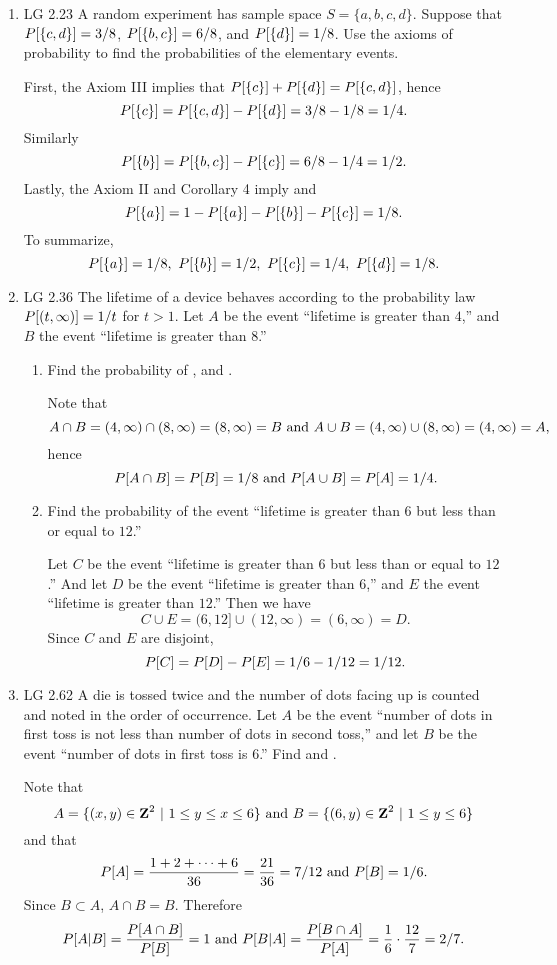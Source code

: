\begin{enumerate}
	\item LG 2.23
	\ifdefined\sol
	A random experiment has sample space $S = \{a, b, c, d\}$.
	Suppose that $P[\{c, d\}] = 3/8$,
	$P[\{b, c\}] = 6/8$,
	and $P[\{d\}] = 1/8$.
	Use the axioms of probability
	to find the probabilities of the elementary events.
	\begin{solution}
	First, the Axiom III implies that $P[\{c\}] + P[\{d\}] = P[\{c,d\}]$,
	hence \[
		P[\{c\}] = P[\{c,d\}] - P[\{d\}] = 3/8 - 1/8 = 1/4.
	\]
	Similarly \[P[\{b\}] = P[\{b,c\}] - P[\{c\}] = 6/8 - 1/4 = 1/2.\]
	Lastly, the Axiom II and Corollary 4 imply
	and \[P[\{a\}] = 1 - P[\{a\}] - P[\{b\}] - P[\{c\}] = 1/8.\]
	To summarize,
	\[
		P[\{a\}] = 1/8,\
		P[\{b\}] = 1/2,\
		P[\{c\}] = 1/4,\
		P[\{d\}] = 1/8.
	\]
	\end{solution}
	\fi

	\item LG 2.36
	\ifdefined\sol
	The lifetime of a device behaves according to the probability law
	$P[(t, \infty)] = 1/t$ for $t > 1$.
	Let $A$ be the event ``lifetime is greater than $4$,''
	and $B$ the event ``lifetime is greater than $8$.''
	\begin{enumerate}
		\item Find the probability of \acapb, and \acupb.
		\begin{solution}
		Note that
		\[
			A\cap B = (4,\infty) \cap (8,\infty) = (8,\infty) = B
			\mbox{ and }
			A\cup B = (4,\infty) \cup (8,\infty) = (4,\infty) = A,
		\]
		hence
		\[
			P[A\cap B] = P[B] = 1/8
			\mbox{ and }
			P[A\cup B] = P[A] = 1/4.
		\]
		\end{solution}

		\item Find the probability of
		the event ``lifetime is greater than $6$ but less than or equal to $12$.''
		\begin{solution}
			Let $C$ be the event ``lifetime is greater than $6$ but less than or equal to $12$.''
			And let $D$ be the event ``lifetime is greater than $6$,''
			and $E$ the event ``lifetime is greater than $12$.''
			Then we have
			\[
				C \cup E = (6,12] \cup (12,\infty) = (6,\infty) = D.
			\]
			Since $C$ and $E$ are disjoint,
			\[
				P[C] = P[D] - P[E] = 1/6 - 1/12 = 1/12.
			\]
		\end{solution}
	\end{enumerate}
	\fi


	\item LG 2.62
	\ifdefined\sol
	A die is tossed twice and the number of dots facing up is
	counted and noted in the order of occurrence.
	Let $A$ be the event
	``number of dots in first toss is not less than number of dots
	in second toss,''
	and let $B$ be the event
	``number of dots in first toss is $6$.''
	Find \cpr{A}{B} and .
	\begin{solution}
		Note that
		\[
			A = \{(x,y)\in{\mbox{\bf Z}}^2~|~1\leq y\leq x\leq 6\}
			\mbox{ and }
			B = \{(6,y)\in{\mbox{\bf Z}}^2~|~1\leq y\leq 6\}
		\]
		and that
		\[
			P[A] = \frac{1+2+\cdots+6}{36} = \frac{21}{36} = 7/12
			\mbox{ and }
			P[B] = 1/6.
		\]
		Since $B\subset A$, $A\cap B = B$.
		Therefore
		\[
			P[A|B] = \frac{P[A\cap B]}{P[B]} = 1
			\mbox{ and }
			P[B|A] = \frac{P[B\cap A]}{P[A]} = \frac{1}{6} \cdot \frac{12}{7}
			= 2/7.
		\]


\end{solution}
\end{enumerate}
